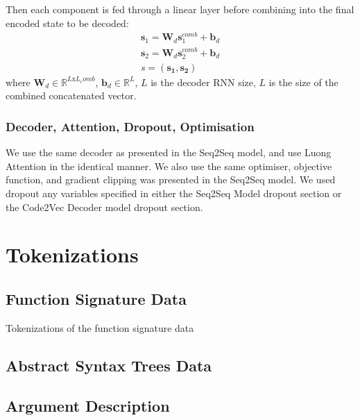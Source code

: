 Then each component is fed through a linear layer before combining into the final encoded state to be decoded:
\begin{align}
    \mathbf{s}_1 = \mathbf{W}_d\mathbf{s}^{comb}_1 + \mathbf{b}_d\\
    \mathbf{s}_2 = \mathbf{W}_d\mathbf{s}^{comb}_2 + \mathbf{b}_d\\
    s = (\mathbf{s_1}, \mathbf{s_2})
\end{align}
where $\mathbf{W}_d \in \mathbb{R}^{L\text{x}L_comb}$, 
$\mathbf{b}_d \in \mathbb{R}^{L}$,
$L$ is the decoder RNN size,
$L$ is the size of the combined concatenated vector.


\subsubsection{Decoder, Attention, Dropout, Optimisation}
We use the same decoder as presented in the Seq2Seq model, and use Luong Attention in the identical manner.
We also use the same optimiser, objective function, and gradient clipping was presented in the Seq2Seq model.
We used dropout any variables specified in either the Seq2Seq Model dropout section or the Code2Vec Decoder model dropout section.


\section{Tokenizations} %
\label{sec:tokenizations}

\subsection{Function Signature Data}

Tokenizations of the function signature data

\subsection{Abstract Syntax Trees Data }


\subsection{Argument Description}







